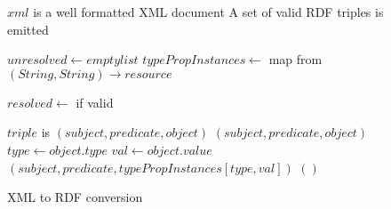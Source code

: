 \documentclass[conference]{IEEEtran}
\begin{document}
\begin{figure*}
    \caption{XML to RDF conversion}
    \label{xml-to-rdf-algo}
    \begin{algorithmic}
            \Require $xml$ is a well formatted XML document
            \Ensure A set of valid RDF triples is emitted

            \State $unresolved\gets empty list$
            \State $typePropInstances\gets$ map from $(String, String) \rightarrow resource$

                \State {}
            \EndFor

                \State $resolved \gets$ 
                \State {} if valid
            \EndFor
        \EndFunction

            \Require $triple$ is $(subject, predicate, object)$
                \State \Return $(subject, predicate, object)$
                \State $type\gets object.type$
                \State $val\gets object.value$
                    \State \Return $(subject, predicate, typePropInstances[type,val])$
                \EndIf
                \State \Return $()$
            \EndIf
        \EndFunction
    \end{algorithmic}
\end{figure*}
\end{document}
